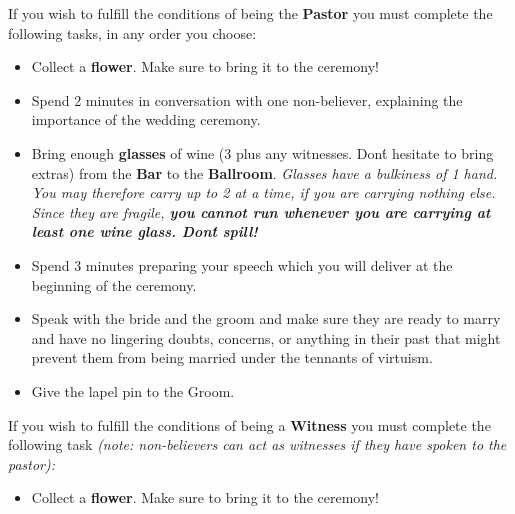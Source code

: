 \documentclass[green]{guildcamp1}
\begin{document}
If you wish to fulfill the conditions of being the {\bf Pastor} you must complete the following tasks, in any order you choose:
\begin{itemize}
  \item Collect a {\bf flower}. Make sure to bring it to the ceremony!
  \item Spend 2 minutes in conversation with one non-believer, explaining the importance of the wedding ceremony.
  \item Bring enough {\bf glasses} of wine (3 plus any witnesses. Don\'t hesitate to bring extras) from the {\bf Bar} to the {\bf Ballroom}. {\it Glasses have a bulkiness of 1 hand. You may therefore carry up to 2 at a time, if you are carrying nothing else. Since they are fragile, \bf{ you cannot run} whenever you are carrying at least one wine glass. Don\'t spill!}
  \item Spend 3 minutes preparing your speech which you will deliver at the beginning of the ceremony.
  \item Speak with the bride and the groom and make sure they are ready to marry and have no lingering doubts, concerns, or anything in their past that might prevent them from being married under the tennants of virtuism.
  \item Give the lapel pin to the Groom.
\end{itemize}

If you wish to fulfill the conditions of being a {\bf Witness} you must complete the following task {\it (note: non-believers can act as witnesses if they have spoken to the pastor):}
\begin{itemize}
  \item Collect a {\bf flower}. Make sure to bring it to the ceremony!
\end{itemize}
\end{document}
